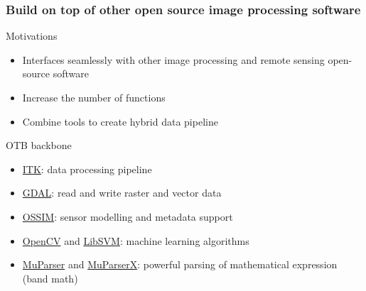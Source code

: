 \documentclass[8pt]{beamer}
\begin{document}
\begin{frame}
\frametitle{Build on top of other open source image processing software}
\begin{block}{Motivations}
\begin{itemize}
\item Interfaces seamlessly with other image processing and remote sensing open-source software
\item Increase the number of functions
\item Combine tools to create hybrid data pipeline
\end{itemize}
\end{block}

\begin{block}{OTB backbone}
\begin{itemize}
\item \href{www.itk.org}{ITK}: data processing pipeline
\item \href{www.gdal.org}{GDAL}: read and write raster and vector data
\item \href{www.ossim.org}{OSSIM}: sensor modelling and metadata support
\item \href{www.opencv.org}{OpenCV} and \href{www.libsvm.org}{LibSVM}: machine learning algorithms
\item \href{www.muparser.org}{MuParser} and \href{www.muparserx.org}{MuParserX}:
  powerful parsing of mathematical expression (band math)
\end{itemize}
\end{block}

\end{frame}
\end{document}

